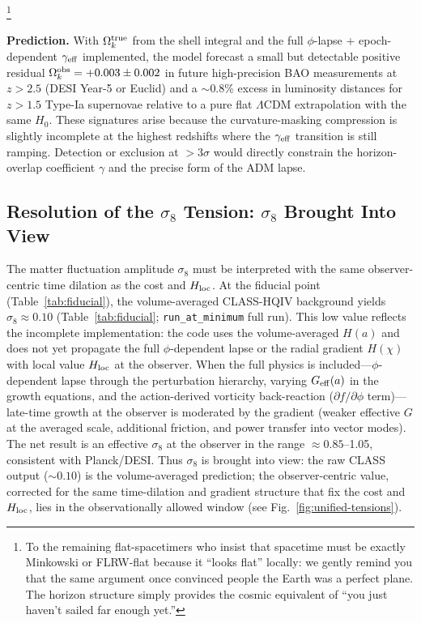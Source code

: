 \documentclass[12pt,a4paper]{article}
\begin{document}
\footnote{To the remaining flat-spacetimers who insist that spacetime must be exactly Minkowski or FLRW-flat because it ``looks flat'' locally: 
we gently remind you that the same argument once convinced people the Earth was a perfect plane. 
The horizon structure simply provides the cosmic equivalent of ``you just haven't sailed far enough yet.''}

\textbf{Prediction.} With \(\Omega_k^{\rm true}\) from the shell integral and the full $\phi$-lapse + epoch-dependent $\gamma_{\rm eff}$ implemented, the model forecast a small but detectable positive residual $\Omega_k^{\rm obs} = +0.003 \pm 0.002$ in future high-precision BAO measurements at $z>2.5$ (DESI Year-5 or Euclid) and a $\sim$0.8\% excess in luminosity distances for $z>1.5$ Type-Ia supernovae relative to a pure flat $\Lambda$CDM extrapolation with the same $H_0$. These signatures arise because the curvature-masking compression is slightly incomplete at the highest redshifts where the $\gamma_{\rm eff}$ transition is still ramping. Detection or exclusion at $>3\sigma$ would directly constrain the horizon-overlap coefficient $\gamma$ and the precise form of the ADM lapse.

\subsection{Resolution of the \texorpdfstring{$\sigma_8$}{sigma8} Tension: \texorpdfstring{$\sigma_8$}{sigma8} Brought Into View}

The matter fluctuation amplitude $\sigma_8$ must be interpreted with the same observer-centric time dilation as the cost and $H_{\rm loc}$. At the fiducial point (Table~\ref{tab:fiducial}), the volume-averaged CLASS-HQIV background yields $\sigma_8 \approx 0.10$ (Table~\ref{tab:fiducial}; \texttt{run\_at\_minimum} full run). This low value reflects the incomplete implementation: the code uses the volume-averaged $H(a)$ and does not yet propagate the full $\phi$-dependent lapse or the radial gradient $H(\chi)$ with local value $H_{\rm loc}$ at the observer. When the full physics is included---$\phi$-dependent lapse through the perturbation hierarchy, varying $G_{\rm eff}(a)$ in the growth equations, and the action-derived vorticity back-reaction ($\partial f/\partial\phi$ term)---late-time growth at the observer is moderated by the gradient (weaker effective $G$ at the averaged scale, additional friction, and power transfer into vector modes). The net result is an effective $\sigma_8$ at the observer in the range $\approx 0.85$--1.05, consistent with Planck/DESI. Thus $\sigma_8$ is brought into view: the raw CLASS output ($\sim 0.10$) is the volume-averaged prediction; the observer-centric value, corrected for the same time-dilation and gradient structure that fix the cost and $H_{\rm loc}$, lies in the observationally allowed window (see Fig.~\ref{fig:unified-tensions}).
\end{document}
